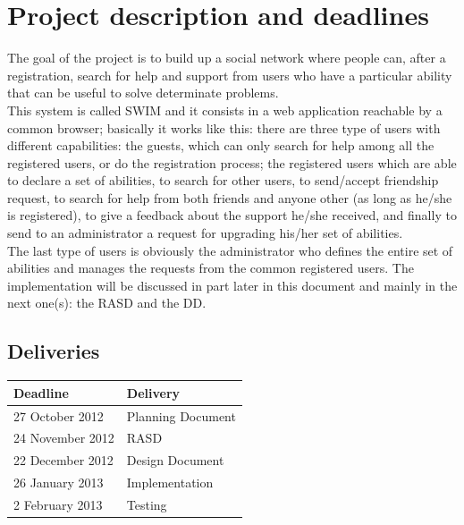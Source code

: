 \documentclass[a4paper,12pt]{article}
\begin{document}
	    \vspace*{\fill}
	\tableofcontents
	    \vspace*{\fill}

\clearpage

\section{Project description and deadlines}
The goal of the project is to build up a social network where people can, after a registration, search for help and support from users who have a particular ability that can be useful to solve determinate problems.\\[1\baselineskip]This system is called SWIM and it consists in a web application reachable by a common browser; basically it works like this: there are three type of users with different capabilities: the guests, which can only search for help among all the registered users, or do the registration process; the registered users which are able to declare a set of abilities, to search for other users, to send/accept friendship request, to search for help from both friends and anyone other (as long as he/she is registered), to give a feedback about the support he/she received, and finally to send to an administrator a request for upgrading his/her set of abilities.\\[1\baselineskip]The last type of users is obviously the administrator who defines the entire set of abilities and manages the requests from the common registered users. The implementation will be discussed in part later in this document and mainly in the next one(s): the RASD and the DD.

\subsection{Deliveries}
\begin{center}

\begin{tabular}{ll}
\rowcolor[gray]{.8}\toprule \textbf{Deadline} & \textbf{Delivery} \\
\midrule 27 October 2012 & Planning Document \\
\midrule 24 November 2012 & RASD \\ 
\midrule 22 December 2012 & Design Document \\
\midrule 26 January 2013 & Implementation \\
\midrule 2 February 2013 & Testing \\
\bottomrule
\end{tabular}
\end{center}
\end{document}
